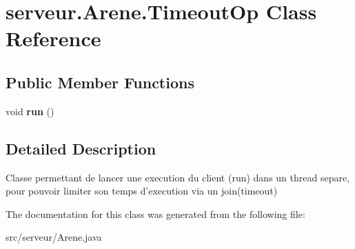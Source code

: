 \hypertarget{classserveur_1_1_arene_1_1_timeout_op}{\section{serveur.\-Arene.\-Timeout\-Op Class Reference}
\label{classserveur_1_1_arene_1_1_timeout_op}
}
\subsection*{Public Member Functions}
\begin{DoxyCompactItemize}
\item 
\hypertarget{classserveur_1_1_arene_1_1_timeout_op_a717da5dace60a4deb7707b5513909cfd}{void {\bfseries run} ()}\label{classserveur_1_1_arene_1_1_timeout_op_a717da5dace60a4deb7707b5513909cfd}

\end{DoxyCompactItemize}


\subsection{Detailed Description}
Classe permettant de lancer une execution du client (run) dans un thread separe, pour pouvoir limiter son temps d'execution via un join(timeout) 

The documentation for this class was generated from the following file\-:\begin{DoxyCompactItemize}
\item 
src/serveur/Arene.\-java\end{DoxyCompactItemize}
